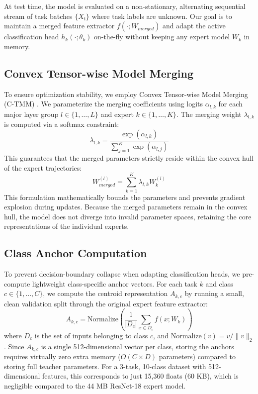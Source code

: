 \documentclass{article}
\theoremstyle{plain}
\theoremstyle{definition}
\theoremstyle{remark}
\begin{document}
At test time, the model is evaluated on a non-stationary, alternating sequential stream of task batches $\{X_t\}$ where task labels are unknown. Our goal is to maintain a merged feature extractor $f(\cdot; W_{merged})$ and adapt the active classification head $h_k(\cdot; \theta_k)$ on-the-fly without keeping any expert model $W_k$ in memory.

\subsection{Convex Tensor-wise Model Merging}
To ensure optimization stability, we employ Convex Tensor-wise Model Merging (C-TMM) \cite{sata2026convex}. We parameterize the merging coefficients using logits $\alpha_{l, k}$ for each major layer group $l \in \{1, \dots, L\}$ and expert $k \in \{1, \dots, K\}$. The merging weight $\lambda_{l, k}$ is computed via a softmax constraint:
\begin{equation}
    \lambda_{l, k} = \frac{\exp(\alpha_{l, k})}{\sum_{j=1}^K \exp(\alpha_{l, j})}
\end{equation}
This guarantees that the merged parameters strictly reside within the convex hull of the expert trajectories:
\begin{equation}
    W_{merged}^{(l)} = \sum_{k=1}^K \lambda_{l, k} W_k^{(l)}
\end{equation}
This formulation mathematically bounds the parameters and prevents gradient explosion during updates. Because the merged parameters remain in the convex hull, the model does not diverge into invalid parameter spaces, retaining the core representations of the individual experts.

\subsection{Class Anchor Computation}
To prevent decision-boundary collapse when adapting classification heads, we pre-compute lightweight class-specific anchor vectors. For each task $k$ and class $c \in \{1, \dots, C\}$, we compute the centroid representation $A_{k, c}$ by running a small, clean validation split through the original expert feature extractor:
\begin{equation}
    A_{k, c} = \text{Normalize}\left( \frac{1}{|D_{c}|} \sum_{x \in D_{c}} f(x; W_k) \right)
\end{equation}
where $D_c$ is the set of inputs belonging to class $c$, and $\text{Normalize}(v) = v / \|v\|_2$. Since $A_{k, c}$ is a single 512-dimensional vector per class, storing the anchors requires virtually zero extra memory ($O(C \times D)$ parameters) compared to storing full teacher parameters. For a 3-task, 10-class dataset with 512-dimensional features, this corresponds to just 15,360 floats (60 KB), which is negligible compared to the 44 MB ResNet-18 expert model.
\end{document}
